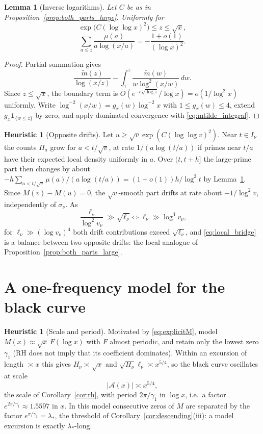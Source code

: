 \documentclass[11pt]{amsart}
\numberwithin{equation}{section}
\theoremstyle{plain}
\newtheorem{lemma}[theorem]{Lemma}
\theoremstyle{definition}
\newtheorem{heuristic}[theorem]{Heuristic}
\theoremstyle{remark}
\newcommand{\Anet}{\mathcal{A}}
\newcommand{\mt}{\widetilde{m}}
\begin{document}
\begin{lemma}[Inverse logarithms]
\label{lem:inverse_log_sum}
Let $C$ be as in Proposition~\ref{prop:both_parts_large}. Uniformly for
\[
\exp\bigl(C(\log\log x)^2\bigr)\le z\le\sqrt x,
\]
\begin{equation}
\label{eq:inverse_log_sum}
  \sum_{a\le z}\frac{\mu(a)}{a\log(x/a)}=-\frac{1+o(1)}{(\log x)^2}.
\end{equation}
\end{lemma}

\begin{proof}
Partial summation gives
\[
\frac{\mt(z)}{\log(x/z)}-
\int_1^z\frac{\mt(w)}{w\log^2(x/w)}\,dw.
\]
Since $z\le\sqrt x$, the boundary term is
$O(e^{-c\sqrt{\log z}}/\log x)=o(1/\log^2x)$ uniformly. Write
$\log^{-2}(x/w)=g_x(w)\log^{-2}x$ with $1\le g_x(w)\le4$, extend
$g_x\mathbf1_{\{w\le z\}}$ by zero, and apply dominated convergence with
\eqref{eq:mtilde_integral}.
\end{proof}

\begin{heuristic}[Opposite drifts]
\label{heu:local_drift}
Let $u\ge\sqrt v\exp(C(\log\log v)^2)$. Near $t\in I_\nu$ the counts
$\Pi_a$ grow for $a<t/\sqrt v$, at rate $1/(a\log(t/a))$ if primes near
$t/a$ have their expected local density uniformly in $a$. Over $(t,t+h]$
the large-prime part then changes by about
$-h\sum_{a<t/\sqrt v}\mu(a)/(a\log(t/a))=(1+o(1))h/\log^2t$ by
Lemma~\ref{lem:inverse_log_sum}. Since $M(v)-M(u)=0$, the $\sqrt v$-smooth
part drifts at rate about $-1/\log^2v$, independently of $\sigma_\nu$. As
\[
\frac{\ell_\nu}{\log^2v_\nu}\gg\sqrt{\ell_\nu}
\iff
\ell_\nu\gg\log^4v_\nu,
\]
for $\ell_\nu\gg(\log v_\nu)^4$ both drift contributions exceed
$\sqrt{\ell_\nu}$, and \eqref{eq:local_bridge} is a balance between two
opposite drifts: the local analogue of
Proposition~\ref{prop:both_parts_large}.
\end{heuristic}

\section{A one-frequency model for the black curve}
\label{sec:model}

\begin{heuristic}[Scale and period]
\label{heu:model}
Motivated by \eqref{eq:explicitM}, model $M(x)\approx\sqrt x\,F(\log x)$
with $F$ almost periodic, and retain only the lowest zero $\gamma_1$ (RH
does not imply that its coefficient dominates). Within an excursion of
length $\asymp x$ this gives $H_\nu\asymp\sqrt x$ and
$\sqrt{H_\nu}\ell_\nu\asymp x^{5/4}$, so the black curve oscillates at scale
\begin{equation}
\label{eq:model_scale}
  |\Anet(x)|\asymp x^{5/4},
\end{equation}
the scale of Corollary~\ref{cor:rh}, with period $2\pi/\gamma_1$ in
$\log x$, i.e.\ a factor $e^{2\pi/\gamma_1}\approx1.5597$ in $x$. In this
model consecutive zeros of $M$ are separated by the factor
$e^{\pi/\gamma_1}=\lambda_*$, the threshold of
Corollary~\ref{cor:descending}(iii): a model excursion is exactly
$\lambda_*$-long.
\end{heuristic}
\end{document}
